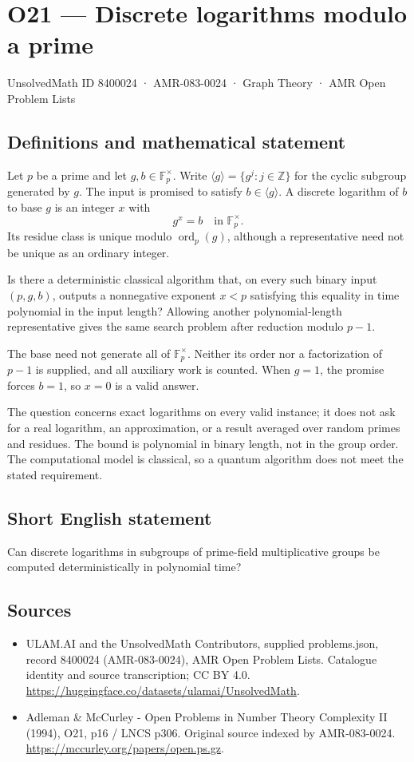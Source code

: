 \documentclass[11pt,a4paper]{article}
\begin{document}
\section*{O21 — Discrete logarithms modulo a prime}\label{8400024}
{\small UnsolvedMath ID 8400024 · AMR-083-0024 · Graph Theory · AMR Open Problem Lists}
\subsection{Definitions and mathematical statement}
Let $p$ be a prime and let $g,b\in\mathbb F_p^\times$. Write $\langle g\rangle=\{g^j:j\in\mathbb Z\}$ for the cyclic subgroup generated by $g$. The input is promised to satisfy $b\in\langle g\rangle$. A discrete logarithm of $b$ to base $g$ is an integer $x$ with
\[
g^x=b\quad\text{in }\mathbb F_p^\times.
\]
Its residue class is unique modulo $\operatorname{ord}_p(g)$, although a representative need not be unique as an ordinary integer.

Is there a deterministic classical algorithm that, on every such binary input $(p,g,b)$, outputs a nonnegative exponent $x<p$ satisfying this equality in time polynomial in the input length? Allowing another polynomial-length representative gives the same search problem after reduction modulo $p-1$.

The base need not generate all of $\mathbb F_p^\times$. Neither its order nor a factorization of $p-1$ is supplied, and all auxiliary work is counted. When $g=1$, the promise forces $b=1$, so $x=0$ is a valid answer.

The question concerns exact logarithms on every valid instance; it does not ask for a real logarithm, an approximation, or a result averaged over random primes and residues. The bound is polynomial in binary length, not in the group order. The computational model is classical, so a quantum algorithm does not meet the stated requirement.
\subsection{Short English statement}
Can discrete logarithms in subgroups of prime-field multiplicative groups be computed deterministically in polynomial time?
\subsection{Sources}
\begin{itemize}
\item[S1] ULAM.AI and the UnsolvedMath Contributors, supplied problems.json, record 8400024 (AMR-083-0024), AMR Open Problem Lists. Catalogue identity and source transcription; CC BY 4.0.
\url{https://huggingface.co/datasets/ulamai/UnsolvedMath}.
\item[S2] Adleman \& McCurley - Open Problems in Number Theory Complexity II (1994), O21, p16 / LNCS p306. Original source indexed by AMR-083-0024.
\url{https://mccurley.org/papers/open.ps.gz}.
\end{itemize}
\end{document}
